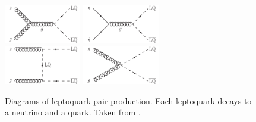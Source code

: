   \begin{figure}[h!]
    \centering
    \includegraphics[width=0.3\textwidth]{figures/MT2_2019/Figure_009-a}
    \includegraphics[width=0.3\textwidth]{figures/MT2_2019/Figure_009-b}\\
    \vspace{3mm}
    \includegraphics[width=0.3\textwidth]{figures/MT2_2019/Figure_009-c}
    \includegraphics[width=0.3\textwidth]{figures/MT2_2019/Figure_009-d}
    \vspace{3mm}
    \caption[Leptoquark pair production diagrams.]{Diagrams of leptoquark pair production. Each leptoquark decays to a neutrino and a quark. Taken from \cite{MT2_2019}.}
    \label{fig:LQdiags}
  \end{figure}  

